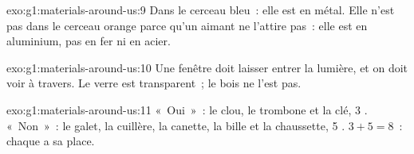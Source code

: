 \begin{solution}{exo:g1:materials-around-us:9}
Dans le cerceau bleu~: elle est en métal. Elle n'est pas dans le cerceau
orange parce qu'un aimant ne l'attire pas~: elle est en aluminium, pas
en fer ni en acier.
\end{solution}

\begin{solution}{exo:g1:materials-around-us:10}
Une fenêtre doit laisser entrer la lumière, et on doit voir à travers.
Le verre est transparent~; le bois ne l'est pas.
\end{solution}

\begin{solution}{exo:g1:materials-around-us:11}
«~Oui~»~: le clou, le trombone et la clé, 3 . «~Non~»~: le galet,
la cuillère, la canette, la bille et la chaussette, 5 .
$3 + 5 = 8$~: chaque  a sa place.
\end{solution}
